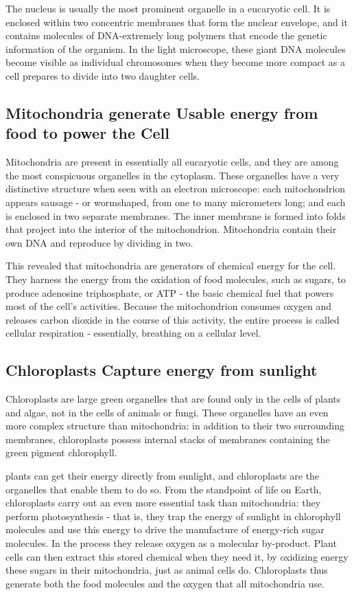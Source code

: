 The nucleus is usually the most prominent organelle in a eucaryotic cell.
It is enclosed within two concentric membranes that form
the nuclear envelope, and it contains molecules of DNA-extremely long
polymers that encode the genetic information of the organism. In the
light microscope, these giant DNA molecules become visible as individual
chromosomes when they become more compact as a cell prepares to
divide into two daughter cells.

\subsection{Mitochondria generate Usable energy from food to power the Cell}

Mitochondria are present in essentially all eucaryotic cells, and they are
among the most conspicuous organelles in the cytoplasm.
These organelles have a very distinctive structure when seen with an
electron microscope: each mitochondrion appears sausage - or wormshaped,
from one to many micrometers long; and each is enclosed in
two separate membranes. The inner membrane is formed into folds that
project into the interior of the mitochondrion. Mitochondria
contain their own DNA and reproduce by dividing in two.

This revealed that mitochondria are generators of
chemical energy for the cell. They harness the energy from the oxidation
of food molecules, such as sugars, to produce adenosine triphosphate,
or ATP - the basic chemical fuel that powers most of the cell’s activities.
Because the mitochondrion consumes oxygen and releases carbon
dioxide in the course of this activity, the entire process is called cellular
respiration - essentially, breathing on a cellular level.

\subsection{Chloroplasts Capture energy from sunlight}

Chloroplasts are large green organelles that are found only in the cells
of plants and algae, not in the cells of animals or fungi. These organelles
have an even more complex structure than mitochondria: in addition to
their two surrounding membranes, chloroplasts possess internal stacks
of membranes containing the green pigment chlorophyll.

plants can get their energy directly from sunlight, and chloroplasts are
the organelles that enable them to do so.
From the standpoint of life on Earth, chloroplasts carry out an even more
essential task than mitochondria: they perform photosynthesis - that is,
they trap the energy of sunlight in chlorophyll molecules and use this
energy to drive the manufacture of energy-rich sugar molecules. In the
process they release oxygen as a molecular by-product. Plant cells can
then extract this stored chemical when they need it, by oxidizing
energy these sugars in their mitochondria, just as animal cells do.
Chloroplasts thus generate both the food molecules and the oxygen that all
mitochondria use.

